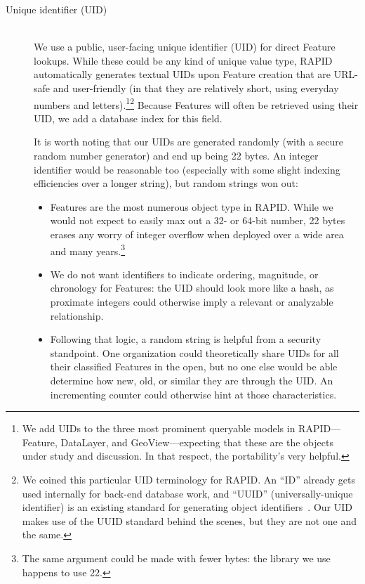 \begin{description}
  \item[Unique identifier (UID)] \hfill \\
  We use a public, user-facing unique identifier (UID) for direct Feature lookups. While these could be any kind of unique value type, RAPID automatically generates textual UIDs upon Feature creation that are URL-safe and user-friendly (in that they are relatively short, using everyday numbers and letters).\footnote{We add UIDs to the three most prominent queryable models in RAPID---Feature, DataLayer, and GeoView---expecting that these are the objects under study and discussion. In that respect, the portability's very helpful.}\footnote{We coined this particular UID terminology for RAPID. An ``ID'' already gets used internally for back-end database work, and ``UUID'' (universally-unique identifier) is an existing standard for generating object identifiers~\cite{Leach}. Our UID makes use of the UUID standard behind the scenes, but they are not one and the same.} Because Features will often be retrieved using their UID, we add a database index for this field.
  
It is worth noting that our UIDs are generated randomly (with a secure random number generator) and end up being 22 bytes. An integer identifier would be reasonable too (especially with some slight indexing efficiencies over a longer string), but random strings won out:
  
  \begin{itemize}
  \item Features are the most numerous object type in RAPID. While we would not expect to easily max out a 32- or 64-bit number, 22 bytes erases any worry of integer overflow when deployed over a wide area and many years.\footnote{The same argument could be made with fewer bytes: the library we use happens to use 22.}
  \item We do not want identifiers to indicate ordering, magnitude, or chronology for Features: the UID should look more like a hash, as proximate integers could otherwise imply a relevant or analyzable relationship.
  \item Following that logic, a random string is helpful from a security standpoint. One organization could theoretically share UIDs for all their classified Features in the open, but no one else would be able determine how new, old, or similar they are through the UID. An incrementing counter could otherwise hint at those characteristics.
\end{itemize}
  

\end{description}
